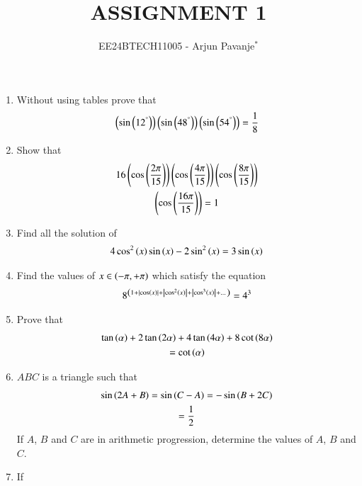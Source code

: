 \documentclass[journal,12pt,article,twocolumn]{IEEEtran}
\theoremstyle{remark}
\begin{document}

\vspace{3cm}

\title{ASSIGNMENT 1}
\author{EE24BTECH11005 - Arjun Pavanje$^{*}$%
}
\maketitle
\newpage
\bigskip
\begin{enumerate}
\item Without using tables prove that 
\begin{align*} 
\left(\sin\left(12^{\degree}\right)\right)\left(\sin\left(48^{\degree}\right)\right)\left(\sin\left(54^{\degree}\right)\right)= \frac{1}{8}
\end{align*}
\hfill {}
\item Show that 
\begin{multline*}
16\left(\cos\left(\frac{2\pi}{15}\right)\right)\left(\cos\left(\frac{4\pi}{15}\right)\right)\left(\cos\left(\frac{8\pi}{15}\right)\right)\\\left(\cos\left(\frac{16\pi}{15}\right)\right)=1
\end{multline*}
\hfill{}
\item Find all the solution of 
\begin{align*}
4\cos^2\left(x\right) \sin \left(x\right) -2\sin^2\left(x\right) = 3\sin \left(x\right)
\end{align*}
\hfill{}
\item Find the values of $x \in \left(-\pi, +\pi\right)$ which satisfy the equation
\begin{align*}
8^{\left(1+\left\vert\cos \left(x\right)\right\vert+\left\vert\cos^2\left(x\right)\right\vert+\left\vert\cos^3\left(x\right)\right\vert+\dots\right)}= 4^3
\end{align*}
\hfill{}
\item Prove that 
\begin{multline*}
\tan \left(\alpha\right)+2\tan \left(2\alpha\right)+4\tan \left(4\alpha\right)+8\cot \left(8\alpha\right)\\=\cot \left(\alpha\right)
\end{multline*}
\hfill{}
\item $ABC$ is a triangle such that 
\begin{multline*}
\sin{\ensuremath{\left(2A+B\right)}}=\sin{\ensuremath{\left(C-A\right)}}=-\sin{\ensuremath{\left(B+2C\right)}}\\=\frac{1}{2}
\end{multline*}
If $A$, $B$ and $C$ are in arithmetic progression, determine the values of $A$, $B$ and $C$.
\hfill{}
\item If 
\begin{align*}

\end{align*}
\end{enumerate}
\end{document}
